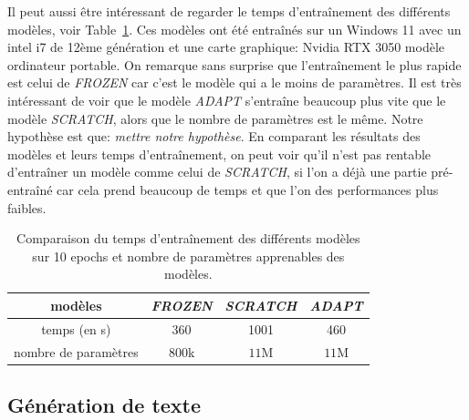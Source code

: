 \documentclass[a4paper]{article}
\begin{document}
Il peut aussi être intéressant de regarder le temps d'entraînement des différents modèles, voir Table~\ref{tab:times}. Ces modèles ont été
entraînés sur un Windows 11 avec un intel i7 de 12ème génération et une carte graphique: Nvidia RTX 3050 modèle ordinateur portable.
On remarque sans surprise que l'entraînement le plus rapide est celui de \textit{FROZEN} car c'est le modèle qui a le moins de paramètres.
Il est très intéressant de voir que le modèle \textit{ADAPT} s'entraîne beaucoup plus vite que le modèle \textit{SCRATCH}, alors que le
nombre de paramètres est le même. Notre hypothèse est que: \textit{mettre notre hypothèse}.
En comparant les résultats des modèles et leurs temps d'entraînement, on peut voir qu'il n'est pas rentable d'entraîner un modèle comme
celui de \textit{SCRATCH}, si l'on a déjà une partie pré-entraîné car cela prend beaucoup de temps et que l'on des performances 
plus faibles.

\begin{table}[ht]
    \centering
    \begin{tabular}{|c|c|c|c|}
        \hline
        modèles & \textit{FROZEN} & \textit{SCRATCH} & \textit{ADAPT} \\
        \hline
        temps (en s) & 360 & 1001 & 460 \\
        \hline
        nombre de paramètres & $800$k & $11$M & $11$M \\
        \hline
    \end{tabular}
    \caption{Comparaison du temps d'entraînement des différents modèles sur 10 epochs et nombre de paramètres apprenables des modèles.}
    \label{tab:times}
\end{table}

\subsection{Génération de texte}

\newpage

\printbibliography
\end{document}
